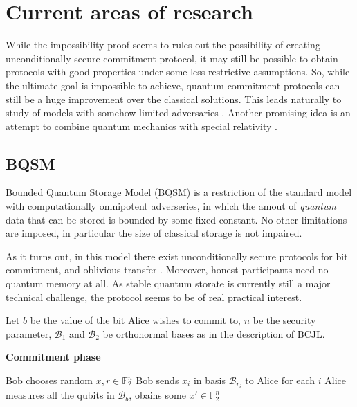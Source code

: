 \documentclass[10pt]{article}
\begin{document}
\section{Current areas of research}

While the impossibility proof seems to rules out the possibility of creating unconditionally secure
commitment protocol, it may still be possible to obtain protocols with good properties under some
less restrictive assumptions. So, while the ultimate goal is impossible to achieve, quantum commitment
protocols can still be a huge improvement over the classical solutions. This leads naturally to study
of models with somehow limited adversaries \cite{Damgard05,Wehner08}. Another promising idea is an
attempt to combine quantum mechanics with special relativity \cite{Kent12}.

\subsection{BQSM}

Bounded Quantum Storage Model (BQSM) is a restriction of the standard model with computationally
omnipotent adverseries, in which the amout of \emph{quantum} data that can be stored is bounded by
some fixed constant. No other limitations are imposed, in particular the size of classical storage
is not impaired\footnotemark. 


As it turns out, in this model there exist unconditionally secure protocols for bit commitment, and
oblivious transfer \cite{Damgard05}. Moreover, honest participants need no quantum memory at all. As
stable quantum storate is currently still a major technical challenge, the protocol seems to be of real
practical interest.

Let \(b\) be the value of the bit Alice wishes to commit to, \(n\) be the security parameter,
\(\mathcal{B}_1\) and \(\mathcal{B}_2\) be orthonormal bases as in the description of BCJL.

\NoCaptionOfAlgo
\begin{algorithm}[H]
\caption{\textbf{Commitment phase}}
Bob chooses random \(x, r\in\mathbb{F}_2^n\) \;
Bob sends \(x_i\) in basis \(\mathcal{B}_{r_i}\) to Alice for each \(i\) \;
Alice measures all the qubits in \(\mathcal{B}_b\), obains some \(x'\in\mathbb{F}_2^n\) \;
\end{algorithm}
\end{document}
